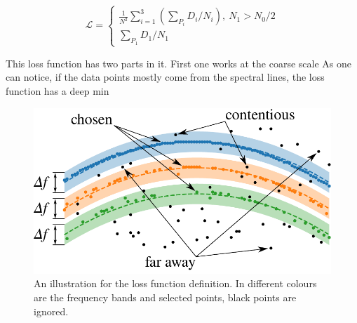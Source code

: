 \documentclass[%
 aip,
 amsmath,amssymb,
 reprint,%
]{revtex4-1}
\begin{document}
\begin{equation}
\mathcal{L} = \begin{cases}
\frac{1}{N^2} \sum_{i=1}^3(\sum_{P_i} D_i/N_i),\ N_1 > N_0/2 \\
\sum_{P_1} D_1  / N_1
\end{cases}
\end{equation}

This loss function has two parts in it. First one works at the coarse scale As one can notice, if the data points mostly come from the spectral lines, the loss function has a deep min	

\begin{figure}
	\centering
	\includegraphics[width=0.8\linewidth]{hough_illustration}
	\caption{An illustration for the loss function definition. In different colours are the frequency bands and selected points, black points are ignored.}
	\label{fig:hough_illustration}
\end{figure}





\end{document}
